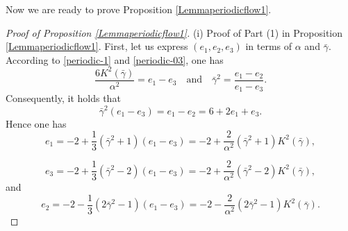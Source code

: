 \documentclass[reqno,12pt]{amsart}
\begin{document}



 
Now we are ready to prove Proposition \ref{Lemmaperiodicflow1}.
\begin{proof}[Proof of Proposition \ref{Lemmaperiodicflow1}] 
 (i) Proof of Part (1) in Proposition \ref{Lemmaperiodicflow1}. 
First, let us express  $(e_1, e_2, e_3)$ in terms of $\alpha$ and $ \bar{\gamma}$. 
According to \eqref{periodic-1} and  \eqref{periodic-03}, one has
\begin{equation*}
   \frac{6 K^2( \bar{\gamma})}{\alpha^2} = e_1 - e_3\quad \text{and}\quad 
     \bar{\gamma}^2 = \frac{e_1 - e_2}{e_1 - e_3}.
\end{equation*}
Consequently, it holds that
\begin{equation*}
   \bar{\gamma}^2 (e_1 - e_3) =e_1 -e_2 =  6+2e_1 + e_3.  
\end{equation*}
Hence one has
\begin{equation}\label{periodic-4}
e_1 = -2 + \frac13( \bar{\gamma}^2 +1) (e_1 - e_3)= -2 + \frac{2}{\alpha^2} ( \bar{\gamma}^2 +1) K^2( \bar{\gamma}), 
\end{equation}

\begin{equation}\label{periodic-5}
    e_3=  -2 + \frac13( \bar{\gamma}^2 -2)(e_1 - e_3)= -2 + \frac{2}{\alpha^2} ( \bar{\gamma}^2 -2 ) K^2( \bar{\gamma}),
\end{equation}
and 
\begin{equation}\label{periodic-6}
    e_2= -2 - \frac13 (2 \bar{\gamma}^2 -1)(e_1 - e_3)= -2 - \frac{2}{\alpha^2}(2 \bar{\gamma}^2 -1) K^2( \bar{\gamma}). 
\end{equation}


\end{proof}
\end{document}
